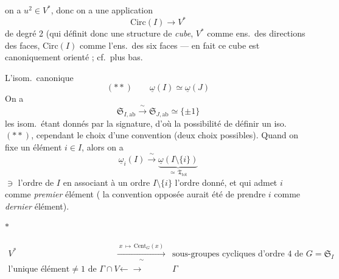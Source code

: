 \documentclass[11pt,a4paper]{article}
\begin{document}
\struck{\ill{}} on a $u^2 \in V^*$, donc on a une application
\[
  \mathrm{Circ}(I) \longrightarrow V^*
\]
de degré 2  (qui définit donc une structure de
\emph{cube}, \ill{} $V^*$ comme ens.\ des directions des faces,
$\mathrm{Circ}(I)$ comme l'ens.\ des six faces --- en fait ce cube est
canoniquement orienté ; cf.\ plus bas.

L'isom.\ canonique
\[
  (**) \qquad \underline{\omega}(I) \simeq \underline{\omega}(J)
\]
On a
\[
  \mathfrak{S}_{I,\mathrm{ab}} \xrightarrow{\;\sim\;} \mathfrak{S}_{J,\mathrm{ab}}
  \simeq \{\pm 1\}
\]
les isom.\ étant donnés par la signature, d'où la possibilité de définir un
iso.\   $(**)$, 
cependant le choix d'une convention (deux choix possibles). Quand on fixe un
élément $i \in I$, alors on a
\[
  \underline{\omega}_i(I) \xrightarrow{\;\sim\;}
  \underbrace{\underline{\omega}(I \setminus \{i\})}_{\simeq\, \mathfrak{T}_{\mathrm{tot}}}
\]
\struck{\ill{}} $\ni$ l'ordre  \struck{\ill{}} de $I$ en associant à
un ordre   $I \setminus \{i\}$ l'ordre donné, et qui
admet $i$ comme \emph{premier} élément ( la
convention \ill{} opposée aurait été de prendre $i$ comme \emph{dernier}
élément).

$*$

\[
  \begin{array}{ccc}
    V^* & \xrightarrow[\;\sim\;]{\;x \,\mapsto\, \mathrm{Cent}_G(x)\;} &
      \text{sous-groupes cycliques d'ordre 4 de } G = \mathfrak{S}_I \\[4pt]
    \text{l'unique élément} \neq 1 \text{ de } \Gamma \cap V &
      \longleftarrow\!\!\!\longrightarrow & \Gamma
  \end{array}
\]
\end{document}
